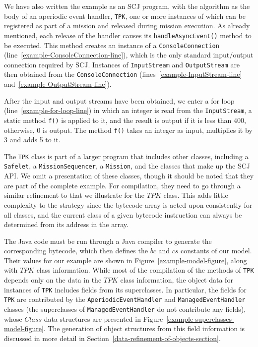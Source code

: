 We have also written the example as an SCJ program, with the algorithm
as the body of an aperiodic event handler, \texttt{TPK}, one or more
instances of which can be registered as part of a mission and released
during mission execution.
As already mentioned, each release of the handler causes its
\texttt{handleAsyncEvent()} method to be executed.
This method creates an instance of a \texttt{ConsoleConnection}
(line~\ref{example-ConsoleConnection-line}), which is the only
standard input/output connection required by SCJ.
Instances of \texttt{InputStream} and \texttt{OutputStream} are then
obtained from the \texttt{ConsoleConnection}
(lines~\ref{example-InputStream-line}
and~\ref{example-OutputStream-line}).

After the input and output streams have been obtained, we enter a for
loop (line~\ref{example-for-loop-line}) in which an integer is read
from the \texttt{InputStream}, a static method \texttt{f()} is applied
to it, and the result is output if it is less than 400, otherwise, 0
is output.
The method \texttt{f()} takes an integer as input, multiplies it by 3
and adds 5 to it.

The \texttt{TPK} class is part of a larger program that includes other
classes, including a \texttt{Safelet}, a \texttt{MissionSequencer}, a
\texttt{Mission}, and the classes that make up the SCJ API.
We omit a presentation of these classes, though it should be noted
that they are part of the complete example.
For compilation, they need to go through a similar refinement to that
we illustrate for the $TPK$ class.
This adds little complexity to the strategy since the bytecode array
is acted upon consistently for all classes, and the current class of a
given bytecode instruction can always be determined from its address
in the array.

The Java code must be run through a Java compiler to generate the
corresponding bytecode, which then defines the $bc$ and $cs$ constants
of our model.
Their values for our example are shown in
Figure~\ref{example-model-figure}, along with $TPK$ class information.
While most of the compilation of the methods of \texttt{TPK} depends
only on the data in the $TPK$ class information, the object data for
instances of \texttt{TPK} includes fields from its superclasses.
In particular, the fields for \texttt{TPK} are contributed by the
\texttt{AperiodicEventHandler} and \texttt{ManagedEventHandler}
classes (the superclasses of \texttt{ManagedEventHandler} do not
contribute any fields), whose $Class$ data structures are presented in
Figure~\ref{example-superclasses-model-figure}.
The generation of object structures from this field information is
discussed in more detail in
Section~\ref{data-refinement-of-objects-section}.

